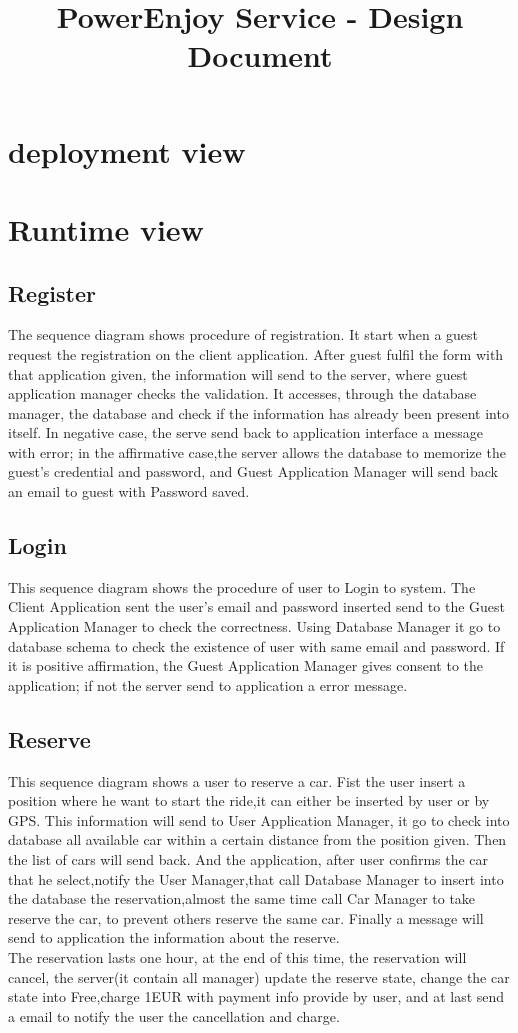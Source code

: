 \documentclass{article}
\title{PowerEnjoy Service - Design Document}
\begin{document}
\section{deployment view}
\section{Runtime view}
\subsection{Register}
The sequence diagram shows procedure of registration. It start when a guest request the registration on the client application. After guest fulfil the form with that application given, the information will send to the server, where guest application manager checks the validation. It accesses, through the database manager, the database and check if the information has already been present into itself. In negative case, the serve send back to application interface a message with error; in the affirmative case,the server allows the database to memorize the guest's credential and password, and Guest Application Manager will send back an email to guest with Password saved.   
		
\subsection{Login}
This sequence diagram shows the procedure of user to Login to system. The Client Application sent the user's email and password inserted send to the Guest Application Manager to check the correctness. Using Database Manager it go to database schema to check the existence of user with same email and password. If it is positive affirmation, the Guest Application Manager gives consent to the application; if not the server send to application a error message.

\subsection{Reserve}
This sequence diagram shows a user to reserve a car. Fist the user insert a position where he want to start the ride,it can either be inserted by user or by GPS. This information will send to User Application Manager, it go to check into database all available car within a certain distance from the position given. Then the list of cars will send back. And the application, after user confirms the car that he select,notify the User Manager,that call Database Manager to insert into the database the reservation,almost the same time call Car Manager to take reserve the car, to prevent others reserve the same car. Finally a message will send to application the information about the reserve.\\
The reservation lasts one hour, at the end of this time, the reservation will cancel, the server(it contain all manager) update the reserve state, change the car state into Free,charge 1EUR with payment info provide by user, and at last send a email to notify the user the cancellation and charge.
\end{document}
